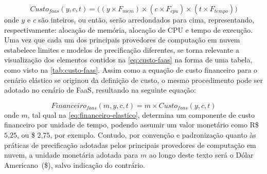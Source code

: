 \documentclass[english,brazilian]{UNISINOSmonografia} %
\begin{document}
\begin{equation}
\label{eq:custo-faas}
Custo_{faas}(y,c,t) = \big( (y \times F_{mem}) \times (c \times F_{cpu}) \times (t \times F_{tempo}) \big)
\end{equation}
onde $ y $ e $ c $ são inteiros, ou então, serão arredondados para cima, representando, respectivamente: alocação de memória, alocação de CPU e tempo de execução.
Uma vez que cada um dos principais provedores de computação em nuvem estabelece limites e modelos de precificação diferentes, se torna relevante a visualização dos elementos contidos na \autoref{eq:custo-faas} na forma de uma tabela, como visto na \autoref{tab:custo-faas}.
Assim como a equação de custo financeiro para o cenário elástico se originou da definição de custo, o mesmo procedimento pode ser adotado no cenário de FaaS, resultando na seguinte equação:

\begin{equation}
\label{eq:financeiro-faas}
Financeiro_{faas}(m,y,c,t) = m \times Custo_{faas}(y,c,t)
\end{equation}
onde $ m $, tal qual na \autoref{eq:financeiro-elastico}, determina um componente de custo financeiro por unidade de tempo, podendo assumir um valor monetário como R\$ $ 5\text{,}25 $,  ou \$ $2\text{,}75$, por exemplo.
Contudo, por convenção e padronização quanto às práticas de precificação adotadas pelos principais provedores de computação em nuvem, a unidade monetária adotada para $ m $ ao longo deste texto será o Dólar Americano~(\$), salvo indicação do contrário.
\end{document}
